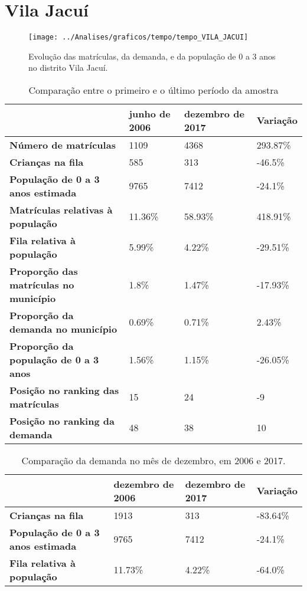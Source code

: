 \section{Vila Jacuí}
\begin{figure}[H]
\centering
\texttt{[image: ../Analises/graficos/tempo/tempo\_VILA\_JACUI]}
\caption{Evolução das matrículas, da demanda, e da população de 0 a 3 anos no distrito Vila Jacuí.}
\end{figure}
\begin{table}[H]
\begin{tabular}{|l|l|l|l|}
\hline
\textbf{}                                      & \textbf{junho de 2006}       & \textbf{dezembro de 2017}    & \textbf{Variação} \\ \hline
\textbf{Número de matrículas}                  & 1109 & 4368 & 293.87\% \\ \hline
\textbf{Crianças na fila}                      & 585 & 313 & -46.5\% \\ \hline
\textbf{População de 0 a 3 anos estimada}      & 9765 & 7412 & -24.1\% \\ \hline
\textbf{Matrículas relativas à população}      & 11.36\% & 58.93\% & 418.91\% \\ \hline
\textbf{Fila relativa à população}             & 5.99\% & 4.22\% & -29.51\% \\ \hline
\textbf{Proporção das matrículas no município} & 1.8\% & 1.47\% & -17.93\% \\ \hline
\textbf{Proporção da demanda no município}     & 0.69\% & 0.71\% & 2.43\% \\ \hline
\textbf{Proporção da população de 0 a 3 anos}  & 1.56\% & 1.15\% & -26.05\% \\ \hline
\textbf{Posição no ranking das matrículas}     & 15 & 24 & -9 \\ \hline
\textbf{Posição no ranking da demanda}         & 48 & 38 & 10 \\ \hline
\end{tabular}
\caption{Comparação entre o primeiro e o último período da amostra}
\end{table}
\begin{table}[H]
\begin{tabular}{|l|l|l|l|}
\hline
\textbf{}                                 & \textbf{dezembro de 2006} & \textbf{dezembro de 2017} & \textbf{Variação} \\ \hline
\textbf{Crianças na fila}                      & 1913 & 313 & -83.64\% \\ \hline
\textbf{População de 0 a 3 anos estimada}      & 9765 & 7412 & -24.1\% \\ \hline
\textbf{Fila relativa à população}             & 11.73\% & 4.22\% & -64.0\% \\ \hline
\end{tabular}
\caption{Comparação da demanda no mês de dezembro, em 2006 e 2017.}
\end{table}

